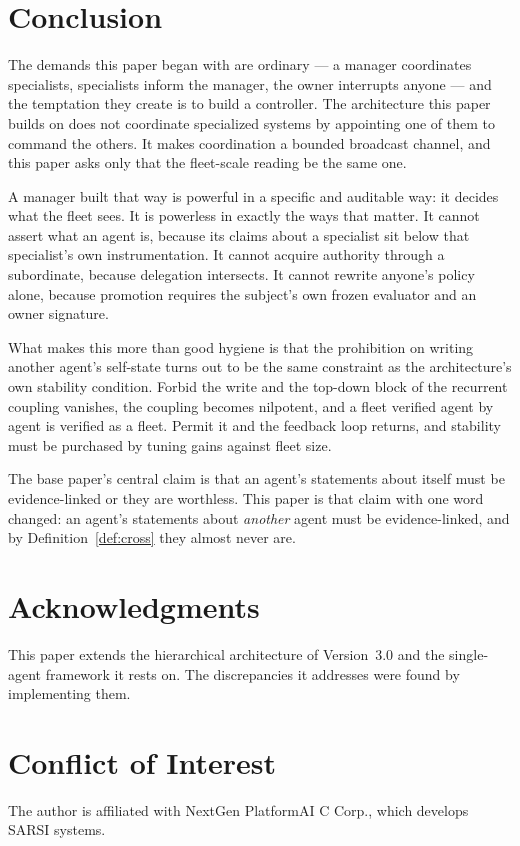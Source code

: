 \documentclass[11pt]{article}
\begin{document}
\section{Conclusion}
\label{sec:conclusion}

The demands this paper began with are ordinary --- a manager coordinates specialists, specialists inform the manager, the owner interrupts anyone --- and the temptation they create is to build a controller. The architecture this paper builds on does not coordinate specialized systems by appointing one of them to command the others. It makes coordination a bounded broadcast channel, and this paper asks only that the fleet-scale reading be the same one.

A manager built that way is powerful in a specific and auditable way: it decides what the fleet sees. It is powerless in exactly the ways that matter. It cannot assert what an agent is, because its claims about a specialist sit below that specialist's own instrumentation. It cannot acquire authority through a subordinate, because delegation intersects. It cannot rewrite anyone's policy alone, because promotion requires the subject's own frozen evaluator and an owner signature.

What makes this more than good hygiene is that the prohibition on writing another agent's self-state turns out to be the same constraint as the architecture's own stability condition. Forbid the write and the top-down block of the recurrent coupling vanishes, the coupling becomes nilpotent, and a fleet verified agent by agent is verified as a fleet. Permit it and the feedback loop returns, and stability must be purchased by tuning gains against fleet size.

The base paper's central claim is that an agent's statements about itself must be evidence-linked or they are worthless. This paper is that claim with one word changed: an agent's statements about \emph{another} agent must be evidence-linked, and by Definition~\ref{def:cross} they almost never are.

\section*{Acknowledgments}
This paper extends the hierarchical architecture of Version~3.0 and the single-agent framework it rests on. The discrepancies it addresses were found by implementing them.

\section*{Conflict of Interest}
The author is affiliated with NextGen PlatformAI C Corp., which develops SARSI systems.



\end{document}
